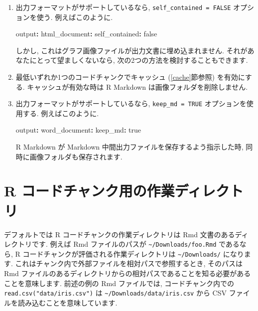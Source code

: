 \documentclass[
  11pt,
]{bxjsreport}
\newenvironment{Shaded}{\begin{snugshade}}{\end{snugshade}}
\newcommand{\AttributeTok}[1]{\textcolor[rgb]{0.77,0.63,0.00}{#1}}
\newcommand{\CharTok}[1]{\textcolor[rgb]{0.31,0.60,0.02}{#1}}
\newcommand{\FunctionTok}[1]{\textcolor[rgb]{0.00,0.00,0.00}{#1}}
\newcommand{\KeywordTok}[1]{\textcolor[rgb]{0.13,0.29,0.53}{\textbf{#1}}}
\begin{document}
\begin{enumerate}
\def\labelenumi{\arabic{enumi}.}
\item
  出力フォーマットがサポートしているなら, \texttt{self\_contained = FALSE} オプションを使う. 例えばこのように.

\begin{Shaded}
\begin{Highlighting}[]
\FunctionTok{output}\KeywordTok{:}
\AttributeTok{  }\FunctionTok{html\_document}\KeywordTok{:}
\AttributeTok{    }\FunctionTok{self\_contained}\KeywordTok{:}\AttributeTok{ }\CharTok{false}
\end{Highlighting}
\end{Shaded}

  しかし, これはグラフ画像ファイルが出力文書に埋め込まれません. それがあなたにとって望ましくないなら, 次の2つの方法を検討することもできます.
\item
  最低いずれか1つのコードチャンクでキャッシュ (\ref{cache}節参照) を有効にする. キャッシュが有効な時は R Markdown は画像フォルダを削除しません.
\item
  出力フォーマットがサポートしているなら, \texttt{keep\_md = TRUE} オプションを使用する. 例えばこのように.

\begin{Shaded}
\begin{Highlighting}[]
\FunctionTok{output}\KeywordTok{:}
\AttributeTok{  }\FunctionTok{word\_document}\KeywordTok{:}
\AttributeTok{    }\FunctionTok{keep\_md}\KeywordTok{:}\AttributeTok{ }\CharTok{true}
\end{Highlighting}
\end{Shaded}

  R Markdown が Markdown 中間出力ファイルを保存するよう指示した時, 同時に画像フォルダも保存されます.
\end{enumerate}

\hypertarget{working-directory}{%
\section{R コードチャンク用の作業ディレクトリ}\label{working-directory}}

デフォルトでは R コードチャンクの作業ディレクトリは Rmd 文書のあるディレクトリです. 例えば Rmd ファイルのパスが \texttt{\textasciitilde{}/Downloads/foo.Rmd} であるなら, R コードチャンクが評価される作業ディレクトリは \texttt{\textasciitilde{}/Downloads/} になります. これはチャンク内で外部ファイルを相対パスで参照するとき, そのパスは Rmd ファイルのあるディレクトリからの相対パスであることを知る必要があることを意味します. 前述の例の Rmd ファイルでは, コードチャンク内での \texttt{read.csv("data/iris.csv")} は \texttt{\textasciitilde{}/Downloads/data/iris.csv} から CSV ファイルを読み込むことを意味しています.
\end{document}
